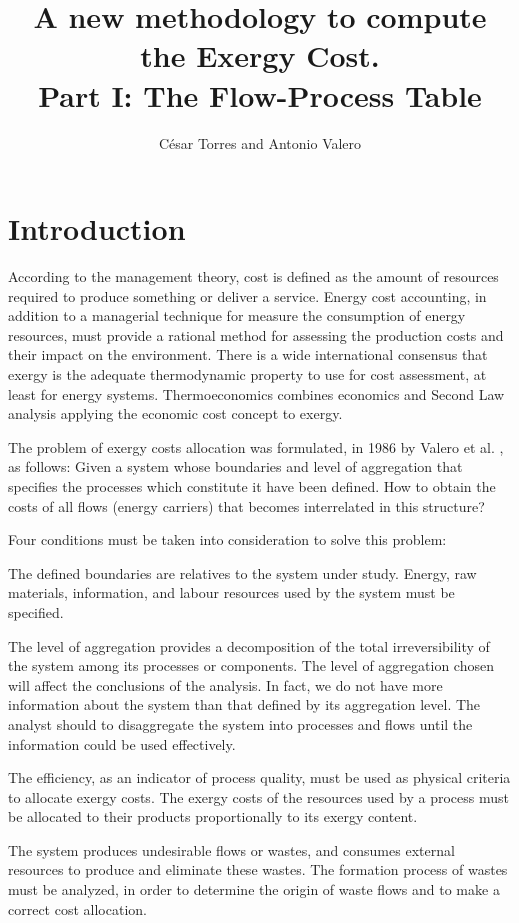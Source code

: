 \documentclass{ecos}
\title{A new methodology to compute the Exergy Cost.\\ Part I: The Flow-Process Table}
\author{César Torres and Antonio Valero}
\date{}
\begin{document}
\maketitle	
\section{Introduction}
According to the management theory, cost is defined as the amount of resources required to produce something or deliver a service. Energy cost accounting, in addition to a managerial technique for measure the consumption of energy resources, must provide a rational method for assessing the production costs and their impact on the environment.
There is a wide international consensus that exergy is the adequate thermodynamic property to use for cost assessment, at least for energy systems. Thermoeconomics combines economics and Second Law analysis applying the economic cost concept to exergy.

The problem of exergy costs allocation was formulated, in 1986 by Valero et al. \cite{Valero1986}, as follows: Given a system whose boundaries and level of aggregation that specifies the processes which constitute it have been defined. How to obtain the costs of all flows (energy carriers) that becomes interrelated in this structure?

Four conditions must be taken into consideration to solve this problem:
\begin{compactenum}[(i)]
	\item The defined boundaries are relatives to the system under study. Energy, raw materials, information, and labour resources used by the system must be specified.
	\item The level of aggregation provides a decomposition of the total irreversibility of the system among its processes or components. The level of aggregation chosen will affect the conclusions of the analysis. In fact, we do not have more information about the system than that defined by its aggregation level. The analyst should to disaggregate the system into processes and flows until the information could be used effectively. 
	\item The efficiency, as an indicator of process quality, must be used as physical criteria to allocate exergy costs. The exergy costs of the resources used by a process must be allocated to their products proportionally to its exergy content. 
	\item The system produces undesirable flows or wastes, and consumes external resources to produce and eliminate these wastes. The formation process of wastes must be analyzed, in order to determine the origin of waste flows and to make a correct cost allocation. 
\end{compactenum}
\end{document}
